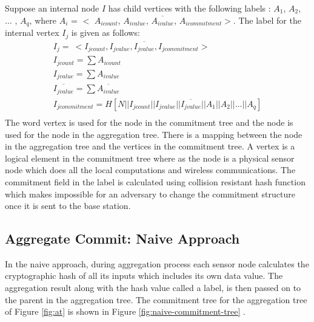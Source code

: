 	Suppose an internal node $I$ has child vertices with the following labels : $A_{1}$, $A_{2}$, $\dotsc$ , $A_{q}$, where $A_{i}$ = $<$ $A_{icount}$, $A_{ivalue}$, $\overline{A_{ivalue}}$, $A_{icommitment}$$>$. 
	The label for the internal vertex $I_{j}$ is given as follows:
	\begin{equation*}
		\begin{array}{l}
			I_{j} =\ <I_{jcount}, I_{jvalue}, \overline{I_{jvalue}}, I_{jcommitment}>\\
			I_{jcount} = \sum A_{icount}\\ 
			I_{jvalue} = \sum A_{ivalue}\\
			\overline{I_{jvalue}} = \sum \overline{A_{ivalue}}\\
			I_{jcommitment} = H[N||I_{jcount}||I_{jvalue}||\overline{I_{jvalue}}||A_{1}||A_{2}|| \dotsc ||A_{q}]\\
		\end{array}
	\end{equation*}
	The word vertex is used for the node in the commitment tree and the node is used for the node in the aggregation tree.
	There is a mapping between the node in the aggregation tree and the vertices in the commitment tree.
	A vertex is a logical element in the commitment tree where as the node is a physical sensor node which does all the local computations and wireless communications.
	The commitment field in the label is calculated using collision resistant hash function which makes impossible for an adversary to change the commitment structure once it is sent to the base station.

	\subsection{Aggregate Commit: Naive Approach}
		\label{sub:aggregate_commit_naive_approach}
		In the naive approach, during aggregation process each sensor node calculates the cryptographic hash of all its inputs which includes its own data value.
		The aggregation result along with the hash value called a label, is then passed on to the parent in the aggregation tree.
		The commitment tree for the aggregation tree of Figure \ref{fig:at} is  shown in Figure \ref{fig:naive-commitment-tree} .
		
